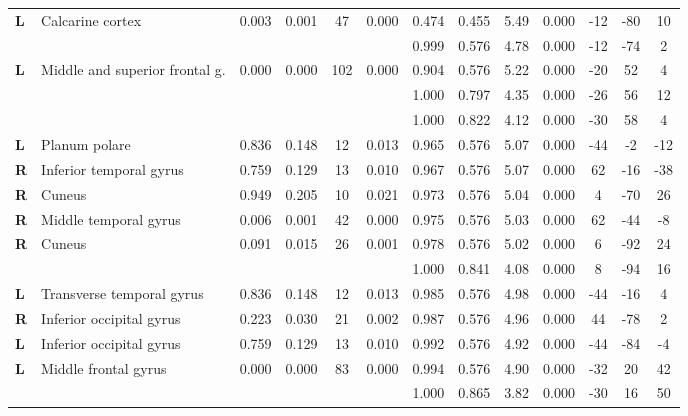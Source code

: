 \begin{landscape}
\begin{fullwidth}
\begin{table}[!ht]
\begin{tabular}{ll|cccc|cccc|ccc}
        \textbf{L} & Calcarine cortex & 0.003 & 0.001 & 47 & 0.000 & 0.474 & 0.455 & 5.49 & 0.000 & -12 & -80 & 10 \\
        & & & & & & 0.999 & 0.576 & 4.78 & 0.000 & -12 & -74 & 2 \\
        \textbf{L} & Middle and superior frontal g. & 0.000 & 0.000 & 102 & 0.000 & 0.904 & 0.576 & 5.22 & 0.000 & -20 & 52 & 4 \\
        & & & & & & 1.000 & 0.797 & 4.35 & 0.000 & -26 & 56 & 12 \\
        & & & & & & 1.000 & 0.822 & 4.12 & 0.000 & -30 & 58 & 4 \\
        \textbf{L} & Planum polare & 0.836 & 0.148 & 12 & 0.013 & 0.965 & 0.576 & 5.07 & 0.000 & -44 & -2 & -12 \\
        \textbf{R} & Inferior temporal gyrus & 0.759 & 0.129 & 13 & 0.010 & 0.967 & 0.576 & 5.07 & 0.000 & 62 & -16 & -38 \\
        \textbf{R} & Cuneus & 0.949 & 0.205 & 10 & 0.021 & 0.973 & 0.576 & 5.04 & 0.000 & 4 & -70 & 26 \\
        \textbf{R} & Middle temporal gyrus & 0.006 & 0.001 & 42 & 0.000 & 0.975 & 0.576 & 5.03 & 0.000 & 62 & -44 & -8 \\
        \textbf{R} & Cuneus & 0.091 & 0.015 & 26 & 0.001 & 0.978 & 0.576 & 5.02 & 0.000 & 6 & -92 & 24 \\
        & & & & & & 1.000 & 0.841 & 4.08 & 0.000 & 8 & -94 & 16 \\
        \textbf{L} & Transverse temporal gyrus & 0.836 & 0.148 & 12 & 0.013 & 0.985 & 0.576 & 4.98 & 0.000 & -44 & -16 & 4 \\
        \textbf{R} & Inferior occipital gyrus & 0.223 & 0.030 & 21 & 0.002 & 0.987 & 0.576 & 4.96 & 0.000 & 44 & -78 & 2 \\
        \textbf{L} & Inferior occipital gyrus & 0.759 & 0.129 & 13 & 0.010 & 0.992 & 0.576 & 4.92 & 0.000 & -44 & -84 & -4 \\
        \textbf{L} & Middle frontal gyrus & 0.000 & 0.000 & 83 & 0.000 & 0.994 & 0.576 & 4.90 & 0.000 & -32 & 20 & 42 \\
        & & & & & & 1.000 & 0.865 & 3.82 & 0.000 & -30 & 16 & 50 \\

\end{tabular}
\end{table}
\end{fullwidth}
\end{landscape}
